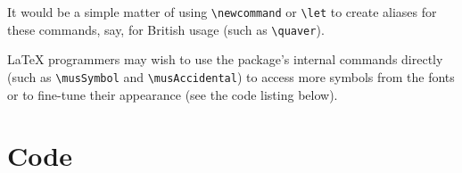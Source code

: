 \documentclass{article}
\begin{document}
It would be a simple matter of using \verb|\newcommand| or \verb|\let| to create
aliases for these commands, say, for British usage (such as \verb|\quaver|).

\LaTeX{} programmers may wish to use the package's internal commands directly 
(such as \verb|\musSymbol| and \verb|\musAccidental|) to
access more symbols from the fonts or to fine-tune their appearance (see the
code listing below).

\section{Code}

\end{document}
